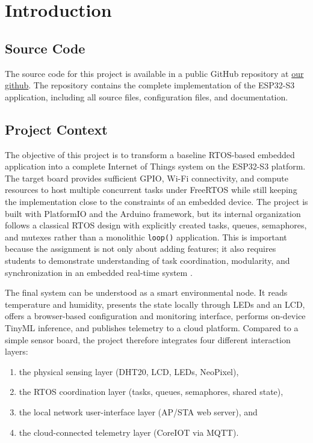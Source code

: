 \section{Introduction}

\subsection{Source Code}

The source code for this project is available in a public GitHub repository at
\href{https://github.com/Hcapacity/IOT_Project.git}{our github}. The repository contains the complete implementation of the ESP32-S3 application, including all source files, configuration files, and documentation.
\subsection{Project Context}
The objective of this project is to transform a baseline RTOS-based embedded
application into a complete Internet of Things system on the ESP32-S3 platform.
The target board provides sufficient GPIO, Wi-Fi connectivity, and compute
resources to host multiple concurrent tasks under FreeRTOS while still keeping
the implementation close to the constraints of an embedded device. The project
is built with PlatformIO and the Arduino framework, but its internal
organization follows a classical RTOS design with explicitly created tasks,
queues, semaphores, and mutexes rather than a monolithic \texttt{loop()}
application. This is important because the assignment is not only about adding
features; it also requires students to demonstrate understanding of task
coordination, modularity, and synchronization in an embedded real-time system
\cite{freertos_kernel,platformio,esp32_arduino}.

The final system can be understood as a smart environmental node. It reads
temperature and humidity, presents the state locally through LEDs and an LCD,
offers a browser-based configuration and monitoring interface, performs
on-device TinyML inference, and publishes telemetry to a cloud platform.
Compared to a simple sensor board, the project therefore integrates four
different interaction layers:
\begin{enumerate}
  \item the physical sensing layer (DHT20, LCD, LEDs, NeoPixel),
  \item the RTOS coordination layer (tasks, queues, semaphores, shared state),
  \item the local network user-interface layer (AP/STA web server), and
  \item the cloud-connected telemetry layer (CoreIOT via MQTT).
\end{enumerate}

